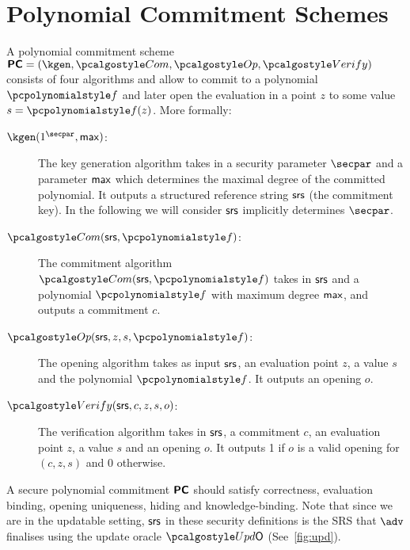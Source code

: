 
\section{Polynomial Commitment Schemes}
\label{sec:pcom}
A polynomial commitment scheme $\PCOM = (\kgen, \com, \open, \verify)$ consists of four
algorithms and allow to commit to a polynomial $\p{f}$ and later open the evaluation in a
point $z$ to some value $s=\p{f}(z)$. More formally:
\begin{description}
\item[$\kgen(1^\secpar, \maxdeg)$:] The key generation algorithm takes in a security
  parameter $\secpar$ and a parameter $\mathsf{max}$ which determines the maximal degree of the
  committed polynomial. It outputs a structured reference string $\mathsf{srs}$ (the commitment
  key). In the following we will consider $\mathsf{srs}$ implicitly determines $\secpar$.
\item[$\com(\srs, \p{f})$:] The commitment algorithm $\com(\srs, \p{f})$ takes
  in $\mathsf{srs}$ and a polynomial $\p{f}$ with maximum degree $\mathsf{max}$, and outputs
  a commitment $c$.
\item[$\open(\srs, z, s, \p{f})$:] The opening algorithm
  takes as input $\mathsf{srs}$, an evaluation point $z$, a
  value $s$ and the polynomial $\p{f}$. It outputs an opening $o$.
\item[$\verify(\srs, c, z, s, o)$:] The verification algorithm takes in $\mathsf{srs}$,
  a commitment $c$, an evaluation point $z$, a value $s$ and an opening $o$. It
  outputs 1 if $o$ is a valid opening for $(c, z, s)$ and 0 otherwise.
\end{description} 

A secure polynomial commitment $\bm{\mathsf{PC}}$ should satisfy correctness, evaluation binding,
opening uniqueness, hiding and knowledge-binding.  Note that since we are in the updatable
setting, $\mathsf{srs}$ in these security definitions is the SRS that $\advse$ finalises using the
update oracle $\initU$ (See~\cref{fig:upd}).


